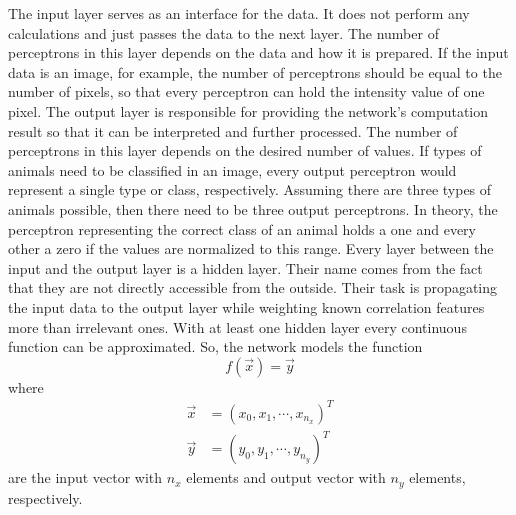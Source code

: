 The input layer serves as an interface for the data.
It does not perform any calculations and just passes the data to the next layer.
The number of perceptrons in this layer depends on the data and how it is prepared.
If the input data is an image, for example, the number of perceptrons should be equal to the number of pixels, so that every perceptron can hold the intensity value of one pixel.
The output layer is responsible for providing the network's computation result so that it can be interpreted and further processed.
The number of perceptrons in this layer depends on the desired number of values.
If types of animals need to be classified in an image, every output perceptron would represent a single type or class, respectively.
Assuming there are three types of animals possible, then there need to be three output perceptrons.
In theory, the perceptron representing the correct class of an animal holds a one and every other a zero if the values are normalized to this range.
Every layer between the input and the output layer is a hidden layer.
Their name comes from the fact that they are not directly accessible from the outside.
Their task is propagating the input data to the output layer while weighting known correlation features more than irrelevant ones.
With at least one hidden layer every continuous function can be approximated.
So, the network models the function 
\begin{equation}
	\label{eq:multilayer-perceptron}
	f(\vec{x}) = \vec{y}
\end{equation}
where
\begin{align}
	\vec{x} &= (x_0, x_1, \cdots, x_{n_x})^T \\
	\vec{y} &= (y_0, y_1, \cdots, y_{n_y})^T
\end{align}
are the input vector with $n_x$ elements and output vector with $n_y$ elements, respectively.

